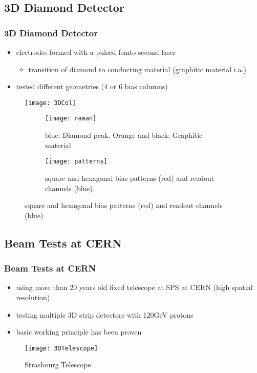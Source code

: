\subsection{3D Diamond Detector}
\begin{frame}
	\frametitle{3D Diamond Detector}
	\begin{minipage}{9cm}
		\begin{itemize}
			\item electrodes formed with a pulsed femto second laser %
			\begin{itemize}
				\item transition of diamond to conducting material (graphitic material i.a.)
			\end{itemize}
			\item tested different geometries (4 or 6 bias columns)
		\end{itemize}
	\end{minipage}
	\begin{minipage}{3cm}
		\begin{figure}
			\centering
			\texttt{[image: 3DCol]}
		\end{figure}
	\end{minipage}
	\begin{figure}
		\centering
		\begin{subfigure}[t]{0.45\textwidth}
			\centering
			\texttt{[image: raman]}
			\caption{blue: Diamond peak. Orange and black: Graphitic material}
		\end{subfigure}
		\begin{subfigure}[t]{0.45\textwidth}
			\centering
			\texttt{[image: patterns]}
			\caption{square and hexagonal bias patterns (red) and readout channels (blue).}
		\end{subfigure}
	\end{figure}
\end{frame}

\subsection{Beam Tests at CERN}
\begin{frame}
	\frametitle{Beam Tests at CERN}
	\begin{itemize}
		\setlength{\itemsep}{\fill}
		\item using more than 20 years old fixed telescope at SPS at CERN (high spatial resolution)
		\item testing multiple 3D strip detectors with 120GeV protons
		\item basic working principle has been proven
	\end{itemize}
	\begin{figure}
		\centering
		\texttt{[image: 3DTelescope]}
		\caption{Strasbourg Telescope}
	\end{figure}
\end{frame}
